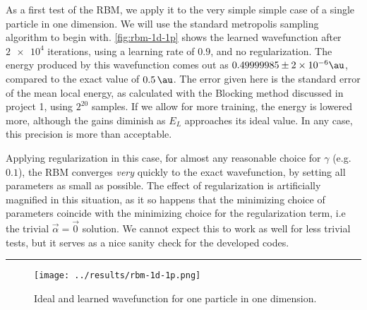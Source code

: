 \documentclass[a4paper, 11pt]{article}
\begin{document}
\begin{multicols}{2}
    As a first test of the RBM, we apply it to the very simple simple case of a
    single particle in one dimension. We will use the standard metropolis
    sampling algorithm to begin with. \autoref{fig:rbm-1d-1p} shows the learned
    wavefunction after $\num{2e4}$ iterations, using a learning rate of $0.9$,
    and no regularization. The energy produced by this wavefunction comes out as
    $0.49999985\pm \num{2e-6}\si{\au}$, compared to the exact value of
    $\SI{0.5}{\au}$. The error given here is the standard error of the mean
    local energy, as calculated with the Blocking method discussed in project 1,
    using $2^{20}$ samples. If we allow for more training, the energy is lowered
    more, although the gains diminish as $E_L$ approaches its ideal
    value. In any case, this precision is more than acceptable.

    Applying regularization in this case, for almost any reasonable choice for
    $\gamma$ (e.g. $0.1$), the RBM converges \emph{very} quickly to the exact
    wavefunction, by setting all parameters as small as possible. The effect of
    regularization is artificially magnified in this situation, as it so happens
    that the minimizing choice of parameters coincide with the minimizing choice
    for the regularization term, i.e the trivial $\vec\alpha=\vec 0$ solution.
    We cannot expect this to work as well for less trivial tests, but it serves
    as a nice sanity check for the developed codes.


\end{multicols}

    \hrule
\begin{figure}[ht]
    \centering
    \texttt{[image: ../results/rbm-1d-1p.png]}
    \caption{Ideal and learned wavefunction for one particle in one dimension.}
    \label{fig:rbm-1d-1p}
\end{figure}
\end{document}
